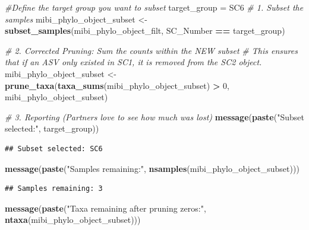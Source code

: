 \documentclass[
]{article}
\newenvironment{Shaded}{\begin{snugshade}}{\end{snugshade}}
\newcommand{\CommentTok}[1]{\textcolor[rgb]{0.56,0.35,0.01}{\textit{#1}}}
\newcommand{\DecValTok}[1]{\textcolor[rgb]{0.00,0.00,0.81}{#1}}
\newcommand{\FunctionTok}[1]{\textcolor[rgb]{0.13,0.29,0.53}{\textbf{#1}}}
\newcommand{\NormalTok}[1]{#1}
\newcommand{\OtherTok}[1]{\textcolor[rgb]{0.56,0.35,0.01}{#1}}
\newcommand{\SpecialCharTok}[1]{\textcolor[rgb]{0.81,0.36,0.00}{\textbf{#1}}}
\newcommand{\StringTok}[1]{\textcolor[rgb]{0.31,0.60,0.02}{#1}}
\begin{document}
\begin{Shaded}
\begin{Highlighting}[]
\CommentTok{\#Define the target group you want to subset}
\NormalTok{target\_group }\OtherTok{=} \StringTok{\textquotesingle{}SC6\textquotesingle{}}
\CommentTok{\# 1. Subset the samples}
\NormalTok{mibi\_phylo\_object\_subset }\OtherTok{\textless{}{-}} \FunctionTok{subset\_samples}\NormalTok{(mibi\_phylo\_object\_filt, SC\_Number }\SpecialCharTok{==}\NormalTok{ target\_group)}

\CommentTok{\# 2. Corrected Pruning: Sum the counts within the NEW subset}
\CommentTok{\# This ensures that if an ASV only existed in \textquotesingle{}SC1\textquotesingle{}, it is removed from the \textquotesingle{}SC2\textquotesingle{} object.}
\NormalTok{mibi\_phylo\_object\_subset }\OtherTok{\textless{}{-}} \FunctionTok{prune\_taxa}\NormalTok{(}\FunctionTok{taxa\_sums}\NormalTok{(mibi\_phylo\_object\_subset) }\SpecialCharTok{\textgreater{}} \DecValTok{0}\NormalTok{, mibi\_phylo\_object\_subset)}

\CommentTok{\# 3. Reporting (Partners love to see how much was lost)}
\FunctionTok{message}\NormalTok{(}\FunctionTok{paste}\NormalTok{(}\StringTok{"Subset selected:"}\NormalTok{, target\_group))}
\end{Highlighting}
\end{Shaded}

\begin{verbatim}
## Subset selected: SC6
\end{verbatim}

\begin{Shaded}
\begin{Highlighting}[]
\FunctionTok{message}\NormalTok{(}\FunctionTok{paste}\NormalTok{(}\StringTok{"Samples remaining:"}\NormalTok{, }\FunctionTok{nsamples}\NormalTok{(mibi\_phylo\_object\_subset)))}
\end{Highlighting}
\end{Shaded}

\begin{verbatim}
## Samples remaining: 3
\end{verbatim}

\begin{Shaded}
\begin{Highlighting}[]
\FunctionTok{message}\NormalTok{(}\FunctionTok{paste}\NormalTok{(}\StringTok{"Taxa remaining after pruning zeros:"}\NormalTok{, }\FunctionTok{ntaxa}\NormalTok{(mibi\_phylo\_object\_subset)))}
\end{Highlighting}
\end{Shaded}
\end{document}
